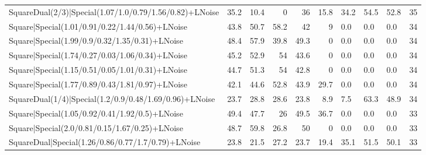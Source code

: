 \begin{tabular}{lrrrrrlllr}
 SquareDual(2/3)|Special(1.07/1.0/0.79/1.56/0.82)+LNoise         &            35.2 &            10.4 &             0   &            36   &           15.8 & 34.2            & 54.5           & 52.8           &           35 \\
 Square|Special(1.01/0.91/0.22/1.44/0.56)+LNoise                 &            43.8 &            50.7 &            58.2 &            42   &            9   & 0.0             & 0.0            & 0.0            &           34 \\
 Square|Special(1.99/0.9/0.32/1.35/0.31)+LNoise                  &            48.4 &            57.9 &            39.8 &            49.3 &            0   & 0.0             & 0.0            & 0.0            &           34 \\
 Square|Special(1.74/0.27/0.03/1.06/0.34)+LNoise                 &            45.2 &            52.9 &            54   &            43.6 &            0   & 0.0             & 0.0            & 0.0            &           34 \\
 Square|Special(1.15/0.51/0.05/1.01/0.31)+LNoise                 &            44.7 &            51.3 &            54   &            42.8 &            0   & 0.0             & 0.0            & 0.0            &           34 \\
 Square|Special(1.77/0.89/0.43/1.81/0.97)+LNoise                 &            42.1 &            44.6 &            52.8 &            43.9 &           29.7 & 0.0             & 0.0            & 0.0            &           34 \\
 SquareDual(1/4)|Special(1.2/0.9/0.48/1.69/0.96)+LNoise          &            23.7 &            28.8 &            28.6 &            23.8 &            8.9 & 7.5             & 63.3           & 48.9           &           34 \\
 Square|Special(1.05/0.92/0.41/1.92/0.5)+LNoise                  &            49.4 &            47.7 &            26   &            49.5 &           36.7 & 0.0             & 0.0            & 0.0            &           33 \\
 Square|Special(2.0/0.81/0.15/1.67/0.25)+LNoise                  &            48.7 &            59.8 &            26.8 &            50   &            0   & 0.0             & 0.0            & 0.0            &           33 \\
 SquareDual|Special(1.26/0.86/0.77/1.7/0.79)+LNoise              &            23.8 &            21.5 &            27.2 &            23.7 &           19.4 & 35.1            & 51.5           & 50.1           &           33 \\

\end{tabular}

